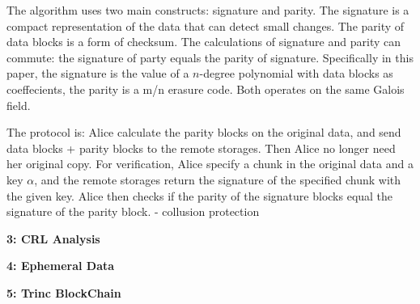 \documentclass[10pt]{article}
\newcommand\question[2]{\vspace{.1in}\textbf{#1: #2}\vspace{.5em}\vspace{.10in}}
\begin{document}
The algorithm uses two main constructs: signature and parity. The signature is a
compact representation of the data that can detect small changes. The parity of
data blocks is a form of checksum. The calculations of signature and parity can
commute: the signature of party equals the parity of signature. Specifically in
this paper, the signature is the value of a $n$-degree polynomial with data
blocks as coeffecients, the parity is a m/n erasure code. Both operates on the
same Galois field.

The protocol is: Alice calculate the parity blocks on the original data, and
send data blocks + parity blocks to the remote storages. Then Alice no longer
need her original copy. For verification, Alice specify a chunk in the original
data and a key $\alpha$, and the remote storages return the signature of the
specified chunk with the given key. Alice then checks if the parity of the
signature blocks equal the signature of the parity block.
- collusion protection

\newpage
\question{3}{CRL Analysis}

\newpage
\question{4}{Ephemeral Data}

\newpage
\question{5}{Trinc BlockChain}
\end{document}
